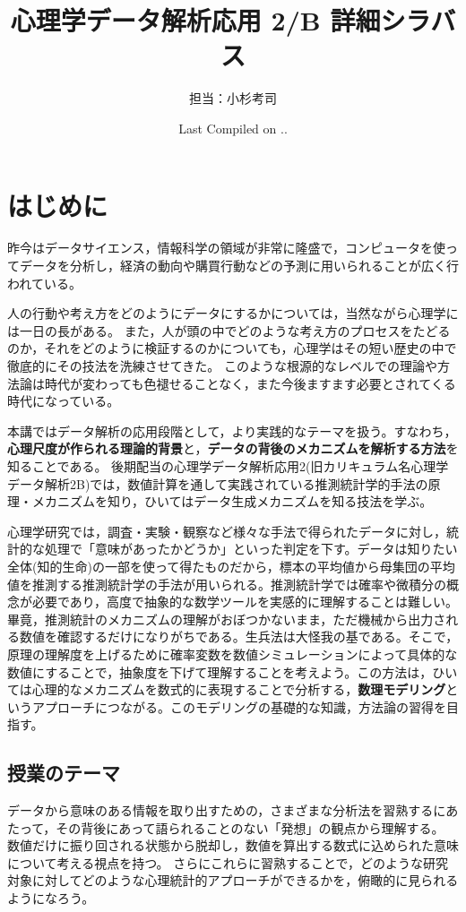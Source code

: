 \documentclass[dvipsnames]{ltjsarticle}
\begin{document}
\title{心理学データ解析応用 2/B 詳細シラバス}
\author{担当：小杉考司}
\date{Last Compiled on \number\year .\number\month .\number\day}
\maketitle
\setcounter{tocdepth}{1}
\tableofcontents
\newpage
\section*{はじめに}
昨今はデータサイエンス，情報科学の領域が非常に隆盛で，コンピュータを使ってデータを分析し，経済の動向や購買行動などの予測に用いられることが広く行われている。

人の行動や考え方をどのようにデータにするかについては，当然ながら心理学には一日の長がある。
また，人が頭の中でどのような考え方のプロセスをたどるのか，それをどのように検証するのかについても，心理学はその短い歴史の中で徹底的にその技法を洗練させてきた。
このような根源的なレベルでの理論や方法論は時代が変わっても色褪せることなく，また今後ますます必要とされてくる時代になっている。

本講ではデータ解析の応用段階として，より実践的なテーマを扱う。すなわち，\textbf{心理尺度が作られる理論的背景}と，\textbf{データの背後のメカニズムを解析する方法}を知ることである。
後期配当の心理学データ解析応用2(旧カリキュラム名心理学データ解析2B)では，数値計算を通して実践されている推測統計学的手法の原理・メカニズムを知り，ひいてはデータ生成メカニズムを知る技法を学ぶ。

心理学研究では，調査・実験・観察など様々な手法で得られたデータに対し，統計的な処理で「意味があったかどうか」といった判定を下す。データは知りたい全体(知的生命)の一部を使って得たものだから，標本の平均値から母集団の平均値を推測する推測統計学の手法が用いられる。推測統計学では確率や微積分の概念が必要であり，高度で抽象的な数学ツールを実感的に理解することは難しい。畢竟，推測統計のメカニズムの理解がおぼつかないまま，ただ機械から出力される数値を確認するだけになりがちである。生兵法は大怪我の基である。そこで，原理の理解度を上げるために確率変数を数値シミュレーションによって具体的な数値にすることで，抽象度を下げて理解することを考えよう。この方法は，ひいては心理的なメカニズムを数式的に表現することで分析する，\textbf{数理モデリング}というアプローチにつながる。このモデリングの基礎的な知識，方法論の習得を目指す。


\subsection*{授業のテーマ}
データから意味のある情報を取り出すための，さまざまな分析法を習熟するにあたって，その背後にあって語られることのない「発想」の観点から理解する。
数値だけに振り回される状態から脱却し，数値を算出する数式に込められた意味について考える視点を持つ。
さらにこれらに習熟することで，どのような研究対象に対してどのような心理統計的アプローチができるかを，俯瞰的に見られるようになろう。
\end{document}
